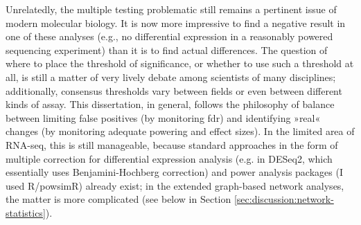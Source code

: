 Unrelatedly, the multiple testing problematic still remains a pertinent issue of modern molecular biology. It is now more impressive to find a negative result in one of these analyses (e.g., no differential expression in a reasonably powered sequencing experiment) than it is to find actual differences. The question of where to place the threshold of significance, or whether to use such a threshold at all, is still a matter of very lively debate among scientists of many disciplines; additionally, consensus thresholds vary between fields or even between different kinds of assay. This dissertation, in general, follows the philosophy of balance between limiting false positives (by monitoring \ac{fdr}) and identifying »real« changes (by monitoring adequate powering and effect sizes). In the limited area of RNA-seq, this is still manageable, because standard approaches in the form of multiple correction for differential expression analysis (e.g. in DESeq2,\cite{Love2014} which essentially uses Benjamini-Hochberg correction) and power analysis packages (I used R/powsimR\cite{Vieth2017}) already exist; in the extended graph-based network analyses, the matter is more complicated (see below in Section \ref{sec:discussion:network-statistics}).

